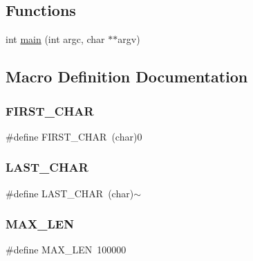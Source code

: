 \subsection*{Functions}
\begin{DoxyCompactItemize}
\item 
int \mbox{\hyperlink{adat-devel_2other__libs_2filedb_2filehash_2tdualwrite_8c_a3c04138a5bfe5d72780bb7e82a18e627}{main}} (int argc, char $\ast$$\ast$argv)
\end{DoxyCompactItemize}


\subsection{Macro Definition Documentation}
\mbox{\label{adat-devel_2other__libs_2filedb_2filehash_2tdualwrite_8c_af1c5fd90d1b8a22169133f549223f2e1}} 
\subsubsection{\texorpdfstring{FIRST\_CHAR}{FIRST\_CHAR}}
{\footnotesize\ttfamily \#define F\+I\+R\+S\+T\+\_\+\+C\+H\+AR~(char)\textquotesingle{}0\textquotesingle{}}

\mbox{\label{adat-devel_2other__libs_2filedb_2filehash_2tdualwrite_8c_a31911f021a0d09eed9a5269d0648dfde}} 
\subsubsection{\texorpdfstring{LAST\_CHAR}{LAST\_CHAR}}
{\footnotesize\ttfamily \#define L\+A\+S\+T\+\_\+\+C\+H\+AR~(char)\textquotesingle{}$\sim$\textquotesingle{}}

\mbox{\label{adat-devel_2other__libs_2filedb_2filehash_2tdualwrite_8c_aabf4f709c8199e41cf279c77112345fe}} 
\subsubsection{\texorpdfstring{MAX\_LEN}{MAX\_LEN}}
{\footnotesize\ttfamily \#define M\+A\+X\+\_\+\+L\+EN~100000}

